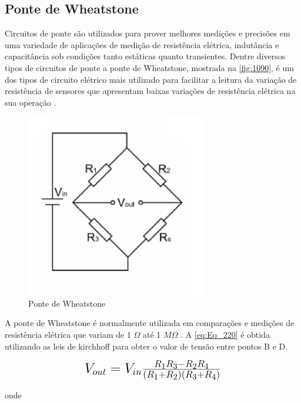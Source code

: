 \subsection{Ponte de Wheatstone}

Circuitos de ponte são utilizados para prover melhores medições e precisões em uma variedade de aplicações de medição de resistência elétrica, indutância e capacitância
sob condições tanto estáticas quanto transientes.
Dentre diversos tipos de circuitos de ponte a ponte de Wheatstone, mostrada na \autoref{fig:1090}, é um dos tipos de circuito elétrico
mais utilizado para facilitar a leitura da variação de resistência de sensores que apresentam baixas variações de resistência elétrica na sua operação \autocite{Hollman2011}.

\begin{figure}[htb]
	\caption{\label{fig:1090} Ponte de Wheatstone}
	\begin{center}
		\includegraphics[width=300]{pictures/1090.png}
	\end{center}
\end{figure}

A ponte de Wheatstone é normalmente utilizada em comparações e medições de resistência elétrica que variam de 1 $\Omega$ até 1 $M\Omega$ \autocite{Hollman2011}.
A \autoref{eq:Eq_220} é obtida utilizando as leis de kirchhoff para obter o valor de tensão entre pontos B e D.

\begin{equation}\label{eq:Eq_220}%
\mbox{\fontsize{17.28}{21.6}\selectfont\( %
V_{out} = V_{in} \frac{R_1 R_3 - R_2 R_4}{(R_1 + R_2)(R_3 + R_4)}
\)} %
\end{equation}

onde

